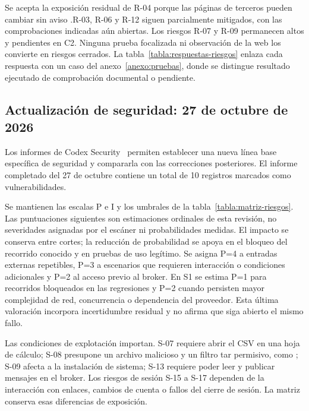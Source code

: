 Se acepta la exposición residual de R-04 porque las páginas de terceros pueden cambiar sin aviso .R-03, R-06 y R-12 siguen parcialmente mitigados, con las comprobaciones indicadas aún abiertas. Los riesgos R-07 y R-09 permanecen altos y pendientes en C2. Ninguna prueba focalizada ni observación de la web los convierte en riesgos cerrados. La tabla~\ref{tabla:respuestas-riesgos} enlaza cada respuesta con un caso del anexo~\ref{anexo:pruebas}, donde se distingue resultado ejecutado de comprobación documental o pendiente.

\subsection{Actualización de seguridad: 27 de octubre de 2026}
\label{sec:riesgos-seguridad-octubre}

Los informes de Codex Security~\cite{codexSecurity} permiten establecer una nueva línea base específica de seguridad y compararla con las correcciones posteriores. El informe completado del 27 de octubre contiene un total de 10 registros marcados como vulnerabilidades.

Se mantienen las escalas P e I y los umbrales de la tabla~\ref{tabla:matriz-riesgos}. Las puntuaciones siguientes son estimaciones ordinales de esta revisión, no severidades asignadas por el escáner ni probabilidades medidas. El impacto se conserva entre cortes; la reducción de probabilidad se apoya en el bloqueo del recorrido conocido y en pruebas de uso legítimo. Se asigna P=4 a entradas externas repetibles, P=3 a escenarios que requieren interacción o condiciones adicionales y P=2 al acceso previo al broker. En S1 se estima P=1 para recorridos bloqueados en las regresiones y P=2 cuando persisten mayor complejidad de red, concurrencia o dependencia del proveedor. Esta última valoración incorpora incertidumbre residual y no afirma que siga abierto el mismo fallo.

Las condiciones de explotación importan. S-07 requiere abrir el CSV en una hoja de cálculo; S-08 presupone un archivo malicioso y un filtro tar permisivo, como ; S-09 afecta a la instalación de sistema; S-13 requiere poder leer y publicar mensajes en el broker. Los riesgos de sesión S-15 a S-17 dependen de la interacción con enlaces, cambios de cuenta o fallos del cierre de sesión. La matriz conserva esas diferencias de exposición.

